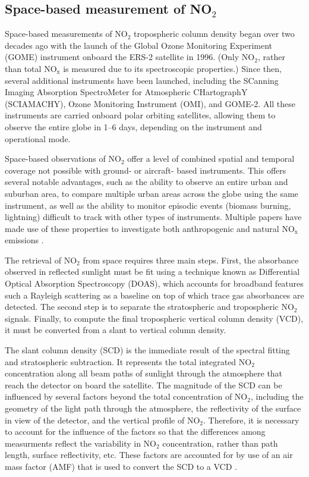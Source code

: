 \documentclass[a4paper,10pt,oneside]{article}
\newcommand{\ce}[1]{$\mathrm{#1}$}
\begin{document}
\begin{sloppy}
\subsection{Space-based measurement of NO$_2$}

Space-based measurements of \ce{NO_2} tropospheric column density began over two decades ago with the launch of the Global Ozone Monitoring Experiment (GOME) instrument onboard the ERS-2 satellite in 1996. (Only \ce{NO_2}, rather than total \ce{NO_x} is measured due to its spectroscopic properties.) Since then, several additional instruments have been launched, including the SCanning Imaging Absorption SpectroMeter for Atmospheric CHartographY (SCIAMACHY), Ozone Monitoring Instrument (OMI), and GOME-2. All these instruments are carried onboard polar orbiting satellites, allowing them to observe the entire globe in 1--6 days, depending on the instrument and operational mode.

Space-based observations of \ce{NO_2} offer a level of combined spatial and temporal coverage not possible with ground- or aircraft- based instruments.  This offers several notable advantages, such as the ability to observe an entire urban and suburban area, to compare multiple urban areas across the globe using the same instrument, as well as the ability to monitor episodic events (biomass burning, lightning) difficult to track with other types of instruments.  Multiple papers have made use of these properties to investigate both anthropogenic \cite{ding15, lamsal15, tong15, huang14, vinken14, gu13, miyazaki12, russell12, lin10, kim09} and natural \ce{NO_x} emissions \cite{miyazaki14, beirle10, castellanos14, mebust14, mebust13, zorner16}.

The retrieval of \ce{NO_2} from space requires three main steps. First, the absorbance observed in reflected sunlight must be fit using a technique known as Differential Optical Absorption Spectroscopy (DOAS), which accounts for broadband features such a Rayleigh scattering as a baseline on top of which trace gas absorbances are detected. The second step is to separate the stratospheric and tropospheric \ce{NO_2} signals. Finally, to compute the final tropospheric vertical column density (VCD), it must be converted from a slant to vertical column density.

The slant column density (SCD) is the immediate result of the spectral fitting and stratospheric subtraction. It represents the total integrated \ce{NO_2} concentration along all beam paths of sunlight through the atmosphere that reach the detector on board the satellite.  The magnitude of the SCD can be influenced by several factors beyond the total concentration of \ce{NO_2}, including the geometry of the light path through the atmosphere, the reflectivity of the surface in view of the detector, and the vertical profile of \ce{NO_2}. Therefore, it is necessary to account for the influence of the factors so that the differences among measurments reflect the variability in \ce{NO_2} concentration, rather than path length, surface reflectivity, etc. These factors are accounted for by use of an air mass factor (AMF) that is used to convert the SCD to a VCD \cite{palmer01}. 


\end{sloppy}
\end{document}
